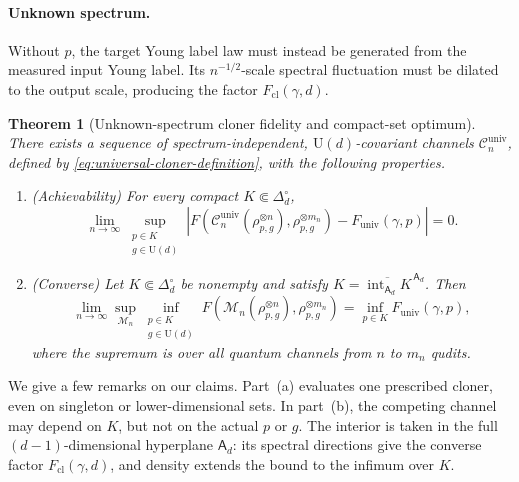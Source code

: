 \documentclass[11pt]{article}
\newtheorem{theorem}{Theorem}[section]
\theoremstyle{remark}
\theoremstyle{plain}
\newcommand{\cC}{\mathcal C}
\newcommand{\cM}{\mathcal M}
\newcommand{\U}{\mathrm U}
\newcommand{\ot}{\otimes}
\newcommand{\Fcl}{F_{\mathrm{cl}}}
\newcommand{\Funiv}{F_{\mathrm{univ}}}
\begin{document}
\paragraph{Unknown spectrum.}
Without \(p\), the target Young label law must instead be generated from
the measured input Young label.  Its \(n^{-1/2}\)-scale spectral
fluctuation must be dilated to the output scale, producing the factor
\(\Fcl(\gamma,d)\).

\begin{theorem}[Unknown-spectrum cloner fidelity and compact-set optimum]
\label{thm:unknown-optimum}
There exists a sequence of spectrum-independent, \(\U(d)\)-covariant channels
\(\cC_n^{\mathrm{univ}}\), defined by \cref{eq:universal-cloner-definition},
with the following properties.
\begin{enumerate}
\item[(a)] (Achievability) For every compact \(K\Subset\Delta_d^\circ\),
\begin{equation}\label{eq:unknown-uniform-achievability}
  \lim_{n\to\infty}
  \sup_{\substack{p\in K\\g\in\U(d)}}
  \left|
  F\!\left(
    \cC_n^{\mathrm{univ}}(\rho_{p,g}^{\ot n}),
    \rho_{p,g}^{\ot m_n}
  \right)-\Funiv(\gamma,p)
  \right|=0.
\end{equation}

\item[(b)](Converse) Let \(K\Subset\Delta_d^\circ\) be nonempty and
  satisfy
  \(K=\overline{\operatorname{int}_{\mathsf A_d}K}^{\,\mathsf A_d}\).
Then
\begin{equation}\label{eq:compact-global-value}
  \lim_{n\to\infty}
  \sup_{\cM_n}
  \inf_{\substack{p\in K\\g\in\U(d)}}
  F\!\left(\cM_n(\rho_{p,g}^{\ot n}),\rho_{p,g}^{\ot m_n}\right)
  =\inf_{p\in K}\Funiv(\gamma,p),
\end{equation}
where the supremum is over all quantum channels from \(n\) to \(m_n\)
qudits.
\end{enumerate}
\end{theorem}

We give a few remarks on our claims. Part~\textup{(a)} evaluates one prescribed cloner, even on singleton or
lower-dimensional sets.  In part~\textup{(b)}, the competing channel may
depend on \(K\), but not on the actual \(p\) or \(g\).  The interior is
taken in the full \((d-1)\)-dimensional hyperplane \(\mathsf A_d\): its
spectral directions give the converse factor \(\Fcl(\gamma,d)\), and
density extends the bound to the infimum over \(K\). 
\end{document}
